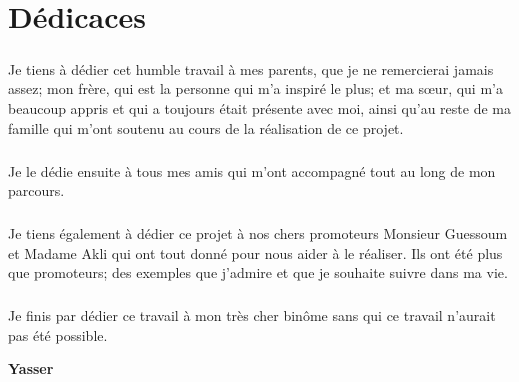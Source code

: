\chapter*{Dédicaces}    

\vspace{1.5cm}

\paragraph{}
Je tiens à dédier cet humble travail à mes parents, que je ne remercierai jamais assez; mon frère, qui est la personne qui m'a inspiré le plus; et ma sœur, qui m'a beaucoup appris et qui a toujours était présente avec moi, ainsi qu'au reste de ma famille qui m'ont soutenu au cours de la réalisation de ce projet. 
\paragraph{}
Je le dédie ensuite à tous mes amis qui m'ont accompagné tout au long de mon parcours. 
\paragraph{}
Je tiens également à dédier ce projet à nos chers promoteurs Monsieur Guessoum et Madame Akli qui ont tout donné pour nous aider à le réaliser. Ils ont été plus que promoteurs; des exemples que j'admire et que je souhaite suivre dans ma vie.
\paragraph{}
Je finis par dédier ce travail à mon très cher binôme sans qui ce travail n'aurait pas été possible.

\vspace{0.5cm}
\begin{center}
	\Large
	\hspace{12.5cm}
	\textbf{Yasser}
\end{center}